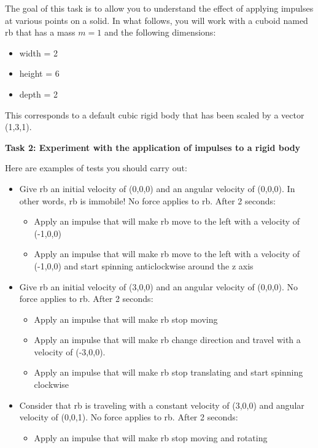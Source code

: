 \documentclass[12pt]{article}
\begin{document}
The goal of this task is to allow you to understand the effect of applying impulses at various points on a solid. In what follows, you will work with a cuboid named rb that has a mass $m = 1$ and the following dimensions:
\begin{itemize}
\item width = 2
\item height = 6
\item depth = 2
\end{itemize}
This corresponds to a default cubic rigid body that has been scaled by a vector (1,3,1).

\textbf{Task 2: Experiment with the application of impulses to a rigid body}

Here are examples of tests you should carry out:
\begin{itemize}
\item Give rb an initial velocity of (0,0,0) and an angular velocity of (0,0,0). In other words, rb is immobile! No force applies to rb. After 2 seconds:
	\begin{itemize}
	\item Apply an impulse that will make rb move to the left with a velocity of (-1,0,0)
	\item Apply an impulse that will make rb move to the left with a velocity of (-1,0,0) and start spinning anticlockwise around the z axis
	\end{itemize}
\item Give rb an initial velocity of (3,0,0) and an angular velocity of (0,0,0). No force applies to rb. After 2 seconds:
	\begin{itemize}
	\item Apply an impulse that will make rb stop moving
	\item Apply an impulse that will make rb change direction and travel with a velocity of (-3,0,0).
	\item Apply an impulse that will make rb stop translating and start spinning clockwise
	\end{itemize}
\item Consider that rb is traveling with a constant velocity of (3,0,0) and angular velocity of (0,0,1). No force applies to rb. After 2 seconds:
	\begin{itemize}
	\item Apply an impulse that will make rb stop moving and rotating
	\end{itemize}
\end{itemize}
\end{document}
